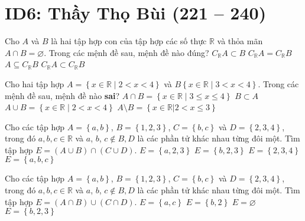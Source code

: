 \section*{ID6: Thầy Thọ Bùi (221 -- 240)}
\begin{ex}%
	Cho $A$ và $B$ là hai tập hợp con của tập hợp các số thực $\mathbb{R}$ và thỏa mãn $A\cap B=\varnothing$. Trong các mệnh đề sau, mệnh đề nào đúng?
	\choice
	{$C_\mathbb{R}A\subset B$}
	{$C_\mathbb{R}A=C_\mathbb{R}B$}
	{\True $A\subseteq C_\mathbb{R}B$}
	{$C_\mathbb{R}A\subset C_\mathbb{R}B$}
\end{ex}

\begin{ex}%
	Cho hai tập hợp $A=\left\{x\in\mathbb{R}\;\big|\;2<x<4\right\}$ và $B\left\{x\in\mathbb{R}\;\big|\;3<x<4\right\}$. Trong các mệnh đề sau, mệnh đề nào \textbf{sai}?
	\choice
	{\True$A\cap B=\left\{x\in\mathbb{R}\;\big|\;3\leq x\leq 4\right\}$}
	{$B\subset A$}
	{$A\cup B=\left\{x\in\mathbb{R}\;\big|\;2<x<4\right\}$}
	{$A\setminus B=\left\{x\in\mathbb{R}\big| 2<x\leq 3\right\}$}
\end{ex}

\begin{ex}%
	Cho các tập hợp $A=\left\{a,b\right\}$, $B=\left\{1,2,3\right\}$, $C=\left\{b,c\right\}$ và $D=\left\{2,3,4\right\}$, trong đó $a, b, c\in\mathbb{R}$ và $a$, $b$, $c\notin B,D$ là các phần tử khác nhau từng đôi một. Tìm tập hợp $E=\left(A\cup B\right)\cap\left(C\cup D\right)$.
	\choice
	{$E=\left\{a,2,3\right\}$}
	{\True $E=\left\{b,2,3\right\}$}
	{$E=\left\{2,3,4\right\}$}
	{$E=\left\{a,b,c\right\}$}
\end{ex}

\begin{ex}%
	Cho các tập hợp $A=\left\{a,b\right\}$, $B=\left\{1,2,3\right\}$, $C=\left\{b,c\right\}$ và $D=\left\{2,3,4\right\}$, trong đó $a, b, c\in\mathbb{R}$ và $a$, $b$, $c\notin B,D$ là các phần tử khác nhau từng đôi một. Tìm tập hợp $E=\left(A\cap B\right)\cup\left(C\cap D\right)$.
	\choice
	{$E=\left\{a,c\right\}$}
	{$E=\left\{b,2\right\}$}
	{\True $E=\varnothing$}
	{$E=\left\{b,2,3\right\}$}
\end{ex}

